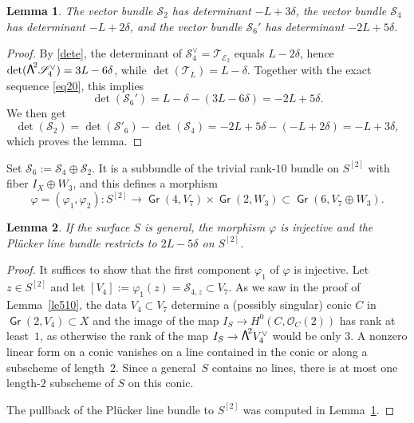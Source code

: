 \documentclass[JEP,XML,SOM,Unicode, NoEqCountersInSection,NoFloatCountersInSection]{cedram}
\let\mathcal\mathscr
\newtheorem{lemm}{Lemma}[section]
\theoremstyle{definition}
\newcommand\cE{\mathcal{E}}
\newcommand\cO{\mathcal{O}}\let\OO\cO
\newcommand\cS{\mathcal{S}}\let\soustauto\cS
\newcommand\cT{\mathcal{T}}
\DeclareMathOperator{\Gr}{\mathsf{Gr}}
\let\phi\varphi
\let\Ld L
\newcommand\bw[1]{{\hbox{\large$\mathsf{\Lambda}$}^{\!#1}}}
\newcommand\hilbS{S^{[2]}}
\begin{document}
\begin{lemm} \label{lepourrangdeuxpart}
The vector bundle
$\cS_2$ has determinant $-\Ld+3\delta$, the vector bundle
$\cS_4$ has determinant $- \Ld+2\delta$, and the vector bundle
$\cS_6'$ has determinant $-2\Ld+5\delta$.
\end{lemm}

\begin{proof} By \eqref{dete}, the determinant of $\cS_4^\vee=\cT_{\cE_2}$ equals $\Ld-2\delta$, hence $\det (\bw2\cS_4^\vee)=3\Ld-6\delta$, while $\det (\cT_{L})=\Ld-\delta$. Together with the exact sequence \eqref{eq20}, this implies
\begin{equation}\label{dets6}
\det (\cS_6')=\Ld-\delta-(3\Ld-6\delta)=-2\Ld+5\delta.
\end{equation}
We then get
\[
\det (\cS_2)=\det(\cS'_6)-\det(\cS_4)=-2\Ld+5\delta -(-\Ld+2\delta)=-\Ld+3\delta,
\]
which proves the lemma.
\end{proof}

Set $\cS_6:=\cS_4\oplus \cS_2$. It is a subbundle of the trivial rank-$10$ bundle on $\hilbS$ with fiber $I_X\oplus W_3$, and this defines a morphism
\begin{equation}\label{defphi}
\phi=(\phi_1,\phi_2)\colon \hilbS\to \Gr(4,V_7)\times \Gr(2,W_3)\subset \Gr(6,V_7\oplus W_3).
\end{equation}

\begin{lemm} \label{lem513}
If the surface $S$ is general, {the morphism $\phi$ is injective} and the Plücker line bundle restricts to $2\Ld-5\delta$ on $\hilbS$.
\end{lemm}

\begin{proof} It suffices to show that the first component $\phi_1$ of $\phi$ is injective.
Let $z\in\hilbS$ and let $ [V_4]:=\phi_1(z)=\cS_{4,z} \subset V_7$.
As we saw in the proof of Lemma~\ref{le510}, the data $V_4\subset V_7$ determine a (possibly singular) conic $C$ in $ \Gr(2,V_4)\subset X$ and
the image of the map $I_S\to H^0(C,\cO_C(2))$ has rank at least~$1$, as otherwise the rank
of the map $I_S\to \bw2V_4^\vee$ would be only $3$. A nonzero linear form
on a conic vanishes on a line contained in the conic or along a subscheme of length~$2$. Since a general~$S$ contains no lines, there is at most one length-$2$ subscheme
of $S$ on this conic.

The pullback of the Plücker line bundle to $\hilbS$ was computed in Lemma~\ref{lepourrangdeuxpart}.
\end{proof}
\end{document}
